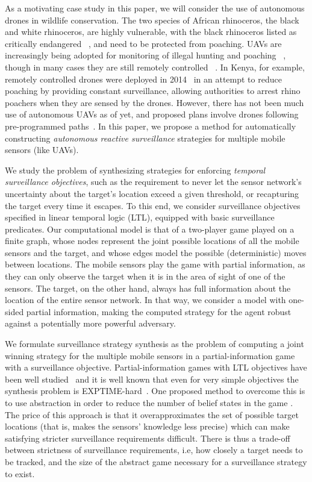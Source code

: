 As a motivating case study in this paper, we will consider the use of autonomous drones in wildlife conservation. The two species of African rhinoceros, the black and white rhinoceros, are highly vulnerable, with the black rhinoceros listed as critically endangered ~\cite{mulero2014remotely}, and need to be protected from poaching. UAVs are increasingly being adopted for monitoring of illegal hunting and poaching ~\cite{schiffman2014drones}, though in many cases they are still remotely controlled ~\cite{mulero2014remotely}. In Kenya, for example, remotely controlled drones were deployed in 2014~\cite{Kenya} in an attempt to reduce poaching  by providing constant surveillance, allowing authorities to arrest rhino poachers when they are sensed by the drones. However, there has not been much use of autonomous UAVs as of yet, and proposed plans involve drones following pre-programmed paths~\cite{Koh12}. In this paper, we propose a method for automatically constructing  \emph{autonomous reactive surveillance} strategies for multiple mobile sensors (like UAVs). 

We study the problem of synthesizing strategies for enforcing \emph{temporal surveillance objectives}, such as the requirement to never let the sensor network's uncertainty about the target's location exceed a given threshold, or recapturing the target every time it escapes. To this end, we consider surveillance objectives specified in linear temporal logic (LTL), equipped with basic surveillance predicates. Our computational model is that of a two-player game played on a finite graph, whose nodes represent the joint possible locations of all the mobile sensors and the target, and whose edges model the possible (deterministic) moves between locations. The mobile sensors play the game with partial information, as they can only observe the target when  it is in the area of sight of one of the sensors. The target, on the other hand, always has full information about the location of the entire sensor network. In that way, we consider a model with one-sided partial information, making the computed strategy for the agent robust against a potentially more powerful adversary. 

We formulate surveillance strategy synthesis as the problem of computing a joint winning strategy for the multiple mobile sensors in a partial-information game with a surveillance objective. Partial-information games with LTL objectives have been well studied~\cite{DoyenR11,Chatterjee2013} and it is well known that even for very simple objectives the synthesis problem is EXPTIME-hard~\cite{Reif84,BerwangerD08}. One proposed method to overcome this is to use abstraction in order to reduce the number of belief states in the game \cite{Bhar16}. The price of this approach is that it overapproximates the set of possible target locations (that is, makes the sensors' knowledge less precise) which can make satisfying stricter surveillance requirements difficult. There is thus a trade-off between strictness of surveillance requirements, i.e, how closely a target needs to be tracked, and the size of the abstract game necessary for a surveillance strategy to exist. 

